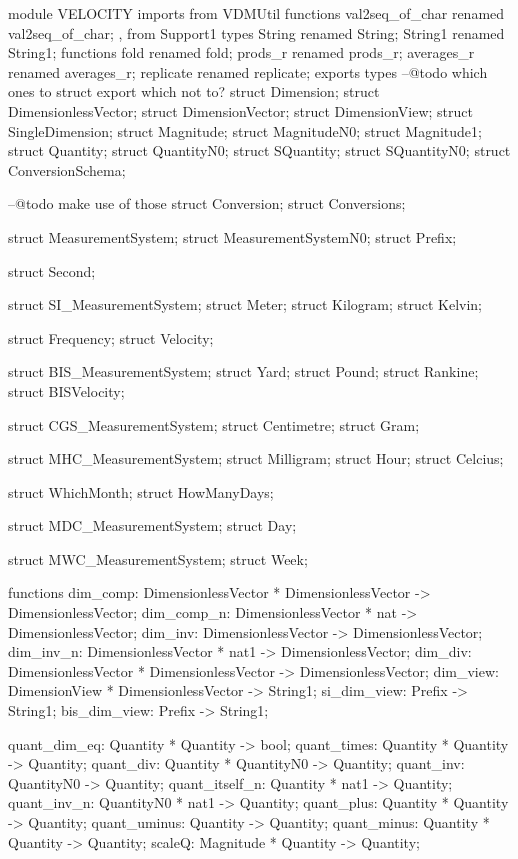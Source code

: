 \documentclass[a4paper]{article}
\begin{document}
\title{}
\author{}
\begin{vdm_al}
module VELOCITY
imports
from VDMUtil
 functions
  val2seq_of_char renamed val2seq_of_char;
,
from Support1
 types 
  String renamed String;
  String1 renamed String1;
 functions
  fold renamed fold;
  prods_r renamed prods_r;
  averages_r renamed averages_r;
  replicate renamed replicate;
exports 
  types
    --@todo which ones to struct export which not to?
    struct Dimension;
  struct DimensionlessVector;
  struct DimensionVector;
  struct DimensionView;
  struct SingleDimension;
  struct Magnitude;
  struct MagnitudeN0;
  struct Magnitude1;
  struct Quantity;
  struct QuantityN0;
  struct SQuantity;
  struct SQuantityN0;
  struct ConversionSchema;

  --@todo make use of those
    struct Conversion;
  struct Conversions;
        
  struct MeasurementSystem; 
  struct MeasurementSystemN0;
  struct Prefix; 

  struct Second;
  
    struct SI_MeasurementSystem;
  struct Meter;
  struct Kilogram;
  struct Kelvin;

    struct Frequency;
    struct Velocity;

  struct BIS_MeasurementSystem;
  struct Yard;
  struct Pound;
  struct Rankine;
  struct BISVelocity;

  struct CGS_MeasurementSystem;
  struct Centimetre;
  struct Gram;
  
  struct MHC_MeasurementSystem;
  struct Milligram;
  struct Hour;
  struct Celcius;

  struct WhichMonth;
  struct HowManyDays;
 
  struct MDC_MeasurementSystem;
  struct Day;
  
  struct MWC_MeasurementSystem;
  struct Week;
   
  functions
    dim_comp: DimensionlessVector * DimensionlessVector -> DimensionlessVector;
  dim_comp_n: DimensionlessVector * nat -> DimensionlessVector;
  dim_inv: DimensionlessVector -> DimensionlessVector;
  dim_inv_n: DimensionlessVector * nat1 -> DimensionlessVector;
  dim_div: DimensionlessVector * DimensionlessVector -> DimensionlessVector;
  dim_view: DimensionView * DimensionlessVector -> String1;
  si_dim_view: Prefix -> String1;
  bis_dim_view: Prefix -> String1;
  
  quant_dim_eq: Quantity * Quantity -> bool;
  quant_times: Quantity * Quantity -> Quantity;
  quant_div: Quantity * QuantityN0 -> Quantity;
  quant_inv: QuantityN0 -> Quantity;
  quant_itself_n: Quantity * nat1 -> Quantity;
  quant_inv_n: QuantityN0 * nat1 -> Quantity;
  quant_plus: Quantity * Quantity -> Quantity;
  quant_uminus: Quantity -> Quantity;
  quant_minus: Quantity * Quantity -> Quantity;
  scaleQ: Magnitude * Quantity -> Quantity;
 

\end{vdm_al}
\end{document}
